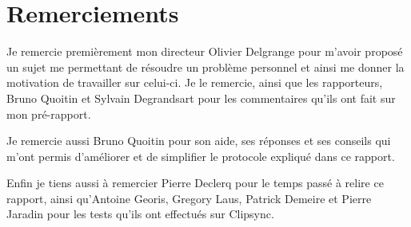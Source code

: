 \documentclass[12pt,a4paper,oneside, titlepage]{report}
\begin{document}
\thispagestyle{empty}


\thispagestyle{empty}
\null
\newpage
{}
\section*{Remerciements}
\renewcommand{\leftmark}{REMERCIEMENTS}

Je remercie premièrement mon directeur Olivier Delgrange pour m'avoir
proposé un sujet me permettant de résoudre un problème personnel
et ainsi me donner la motivation de travailler sur celui-ci. Je le remercie,
ainsi que les rapporteurs, Bruno Quoitin et Sylvain Degrandsart pour les
commentaires qu'ils ont fait sur mon pré-rapport.

Je remercie aussi Bruno Quoitin pour son aide, ses réponses et ses conseils
qui m'ont permis d'améliorer et de simplifier le protocole expliqué dans ce
rapport.

Enfin je tiens aussi à remercier Pierre Declerq pour le temps passé à relire
ce rapport, ainsi qu'Antoine Georis, Gregory Laus, Patrick Demeire et Pierre
Jaradin pour les tests qu'ils ont effectués sur Clipsync.

\newpage
\renewcommand{\leftmark}{TABLE DES MATI\`{E}RES}
\thispagestyle{fancy}
\tableofcontents

\newpage
{}







% 
% 
% 

% 

\printbibliography

\newpage
\appendix
{}

\end{document}
